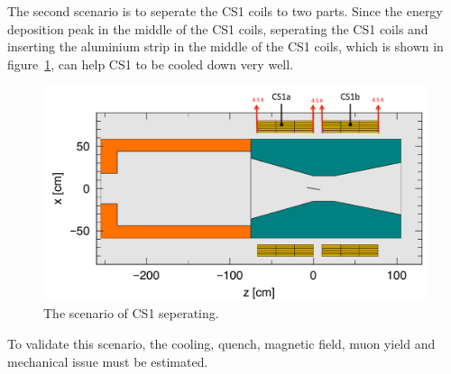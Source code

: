 The second scenario is to seperate the CS1 coils to two parts.
Since the energy deposition peak in the middle of the CS1 coils, seperating the CS1 coils and inserting the aluminium strip in the middle of the CS1 coils, which is shown in figure~\ref{5new}, can help CS1 to be cooled down very well.
\begin{figure}[H]
 \centering
 \includegraphics[scale=0.4]{chapter6/fig/CS1new.pdf}
 \caption{ The scenario of CS1 seperating.}
 \label{5new}
\end{figure}
To validate this scenario, the cooling, quench, magnetic field, muon yield and mechanical issue must be estimated.


